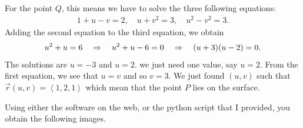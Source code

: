 	
	For the point $Q$, this means we have to solve the three following equations:
	\begin{align*}
		1 + u - v = 2, \quad u + v^2 = 3, \quad u^2 - v^2 = 3 .
		\end{align*}
	Adding the second equation to the third equation, we obtain
		\begin{align*}
		u^2 + u = 6 \quad \Rightarrow \quad u^2 + u - 6 = 0 \quad \Rightarrow \quad (u + 3) (u - 2) = 0 .
		\end{align*}
	The solutions are $u = -3$ and $u = 2$. we just need one value, say $u = 2$. From the first equation, we see that $u = v$ and so $v = 3$. We just found $(u, v)$ such that $\vec{r} (u, v) = \left\langle 1, 2, 1 \right\rangle$ which mean that the point $P$ lies on the surface.
	
	\spc
	
	Using either the software on the web, or the python script that I provided, you obtain the following images.
	

